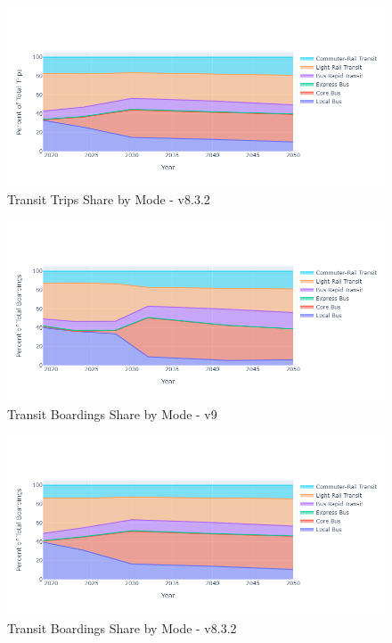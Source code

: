 \documentclass[
  letterpaper,
  DIV=11,
  numbers=noendperiod,
  titlepage=false]{scrreprt}
\begin{document}
\begin{figure}[H]

{\centering \includegraphics{v9x/v900/whats-new/_pictures/pdf-shr-tr-all-832.png}

}

\caption{\label{fig-pdf-shr-tr-all-832}Transit Trips Share by Mode -
v8.3.2}

\end{figure}

\begin{figure}[H]

{\centering \includegraphics{v9x/v900/whats-new/_pictures/pdf-brd-9.png}

}

\caption{\label{fig-pdf-brd-9}Transit Boardings Share by Mode - v9}

\end{figure}

\begin{figure}[H]

{\centering \includegraphics{v9x/v900/whats-new/_pictures/pdf-brd-832.png}

}

\caption{\label{fig-pdf-brd-832}Transit Boardings Share by Mode -
v8.3.2}

\end{figure}
\end{document}
